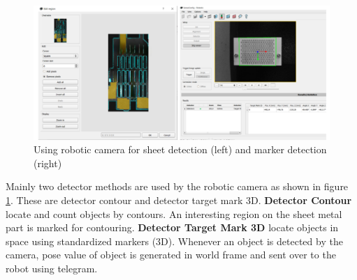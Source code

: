 \begin{figure}[h]
    \centering
    \includegraphics[width=\textwidth]{figures/robotic-detection.png}
    \caption{Using robotic camera for sheet detection (left) and marker detection (right)}
    \label{fig:robotic-detection}
\end{figure}

Mainly two detector methods are used by the robotic camera as shown in figure \ref{fig:robotic-detection}. These are detector contour and detector target mark 3D. \textbf{Detector Contour} locate and count objects by contours. An interesting region on the sheet metal part is marked for contouring. 
\textbf{Detector Target Mark 3D} locate objects in space using standardized markers (3D).
Whenever an object is detected by the camera, pose value of object is generated in world frame and sent over to the robot using telegram.